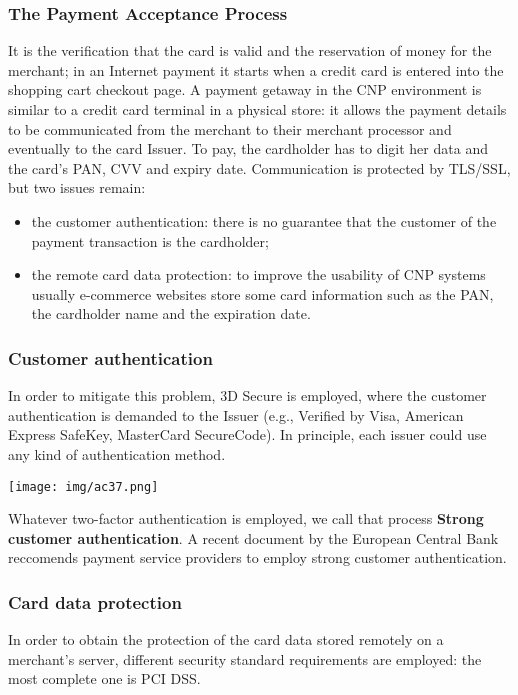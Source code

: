 \documentclass[a4paper, 10pt, titlepage]{article}
\begin{document}
\subsubsection{The Payment Acceptance Process}
It is the verification that the card is valid and the reservation of money for the merchant; in an Internet payment it starts when a credit card is entered into the shopping cart checkout page. A payment getaway in the CNP environment is similar to a credit card terminal in a physical store: it allows the payment details to be communicated from the merchant to their merchant processor and eventually to the card Issuer. To pay, the cardholder has to digit her data and the card's PAN, CVV and expiry date. Communication is protected by TLS/SSL, but two issues remain:
\begin{itemize}
\item the customer authentication: there is no guarantee that the customer of the payment transaction is the cardholder;
\item the remote card data protection: to improve the usability of CNP systems usually e-commerce websites store some card information such as the PAN, the cardholder name and the expiration date.
\end{itemize}

\subsubsection*{Customer authentication}
In order to mitigate this problem, 3D Secure is employed, where the customer authentication is demanded to the Issuer (e.g., Verified by Visa, American Express SafeKey, MasterCard SecureCode). In principle, each issuer could use any kind of authentication method.
\begin{center}
\texttt{[image: img/ac37.png]}
\end{center}
Whatever two-factor authentication is employed, we call that process \textbf{Strong customer authentication}. A recent document by the European Central Bank reccomends payment service providers to employ strong customer authentication.

\subsubsection*{Card data protection}
In order to obtain the protection of the card data stored remotely on a merchant's server, different security standard requirements are employed: the most complete one is PCI DSS.
\end{document}
